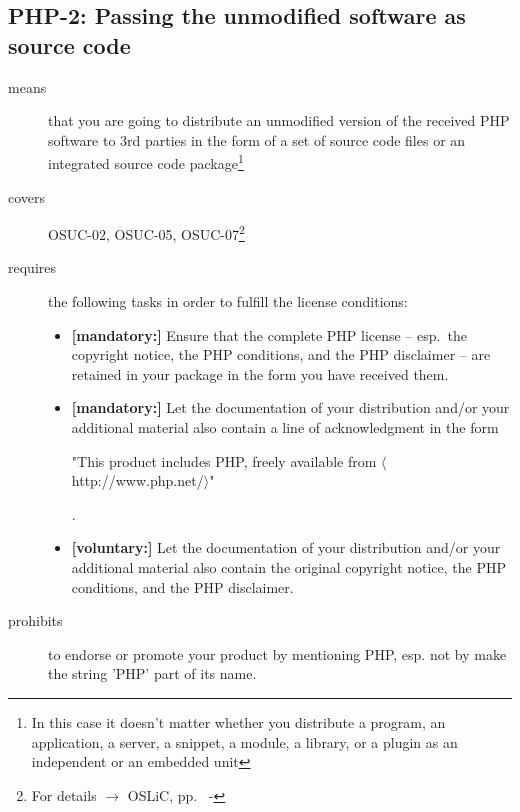 \subsection{PHP-2: Passing the unmodified software as source code}
\label{OSUC-02-PHP} \label{OSUC-05-PHP} \label{OSUC-07-PHP} 

\begin{description}
\item[means] that you are going to distribute an unmodified version of the
received PHP software to 3rd parties in the form of a set of source code files or an
integrated source code package\footnote{In this case it doesn't matter whether
you  distribute a program, an application, a server, a snippet, a module, a
library, or a plugin as an independent or an embedded unit}

\item[covers] OSUC-02, OSUC-05, OSUC-07\footnote{For details $\rightarrow$ OSLiC, pp.\ 
\pageref{OSUC-02-DEF} - \pageref{OSUC-07-DEF}}

\item[requires] the following tasks in order to fulfill the license conditions:
\begin{itemize}
  
  \item \textbf{[mandatory:]} Ensure that the complete PHP license -- esp.\
  the copyright notice, the PHP conditions, and the PHP disclaimer -- are
  retained in your package in the form you have received them.
  
  \item \textbf{[mandatory:]} Let the documentation of your distribution and/or
  your additional material also contain a line of acknowledgment in the form
  \begin{footnotesize}"This product includes PHP, freely available from
  $\langle$http://www.php.net/$\rangle$"\end{footnotesize}.
  
  \item \textbf{[voluntary:]} Let the documentation of your distribution and/or
  your additional material also contain the original copyright notice, the PHP
  conditions, and the PHP disclaimer.
  
\end{itemize}

\item[prohibits] to endorse or promote your product by mentioning PHP, esp. not
by make the string 'PHP' part of its name.

\end{description}

